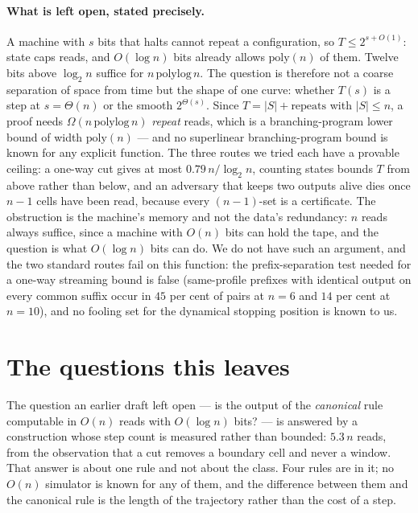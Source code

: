 \documentclass[11pt]{article}
\begin{document}
\paragraph{What is left open, stated precisely.} A machine with $s$ bits that halts cannot repeat a
configuration, so $T\le2^{s+O(1)}$: state caps reads, and $O(\log n)$ bits already allows
$\mathrm{poly}(n)$ of them. Twelve bits above $\log_2 n$ suffice for $n\,\mathrm{polylog}\,n$. The
question is therefore not a coarse separation of space from time but the shape of one curve: whether
$T(s)$ is a step at $s=\Theta(n)$ or the smooth $2^{\Theta(s)}$. Since $T=|S|+\text{repeats}$ with
$|S|\le n$, a proof needs $\Omega(n\,\mathrm{polylog}\,n)$ \emph{repeat} reads, which is a
branching-program lower bound of width $\mathrm{poly}(n)$ --- and no superlinear branching-program
bound is known for any explicit function. The three routes we tried each have a provable ceiling:
a one-way cut gives at most $0.79\,n/\log_2n$, counting states bounds $T$ from above rather than
below, and an adversary that keeps two outputs alive dies once $n-1$ cells have been read, because
every $(n-1)$-set is a certificate. The obstruction is the machine's memory and not the data's redundancy: $n$ reads always suffice, since
a machine with $O(n)$ bits can hold the tape, and the question is what $O(\log n)$ bits can do. We do not have
such an argument, and the two standard routes fail on this function: the prefix-separation test needed
for a one-way streaming bound is false (same-profile prefixes with identical output on every common
suffix occur in $45$ per cent of pairs at $n=6$ and $14$ per cent at $n=10$), and no fooling set for
the dynamical stopping position is known to us.

\section{The questions this leaves}

The question an earlier draft left open --- is the output of the \emph{canonical} rule computable in
$O(n)$ reads with $O(\log n)$ bits? --- is answered by a construction whose step count is measured rather than
bounded: $5.3\,n$ reads, from the observation that a cut removes a boundary cell and never a
window. That answer is about one rule and not about the class.
Four rules are in it; no $O(n)$ simulator is known for any of them, and the difference between them and the
canonical rule is the length of the trajectory rather than the cost of a step.
\end{document}
